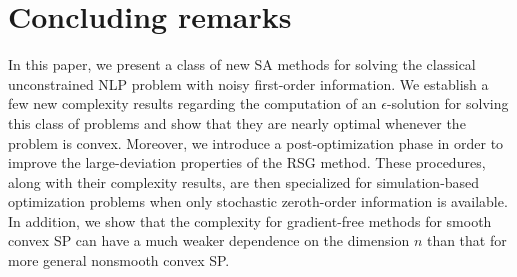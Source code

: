 \documentclass[final]{siamltex}
\def\eqnok#1{(\ref{#1})}
\begin{document}
\section{Concluding remarks} \label{sec_concl}
In this paper, we present a class of new SA methods for solving the classical unconstrained NLP
problem with noisy first-order information. We establish a few new complexity results regarding
the computation of an $\epsilon$-solution for solving this class of problems
and show that they are nearly optimal whenever the problem is convex.
Moreover, we introduce a post-optimization phase in order to improve the large-deviation
properties of the RSG method. These
procedures, along with their complexity results, are then specialized for simulation-based optimization
problems when only stochastic zeroth-order information is available.
In addition, we show that the complexity for gradient-free methods
for smooth convex SP can have a much weaker dependence on the dimension $n$ %
than that for more general nonsmooth convex SP.








\end{document}
